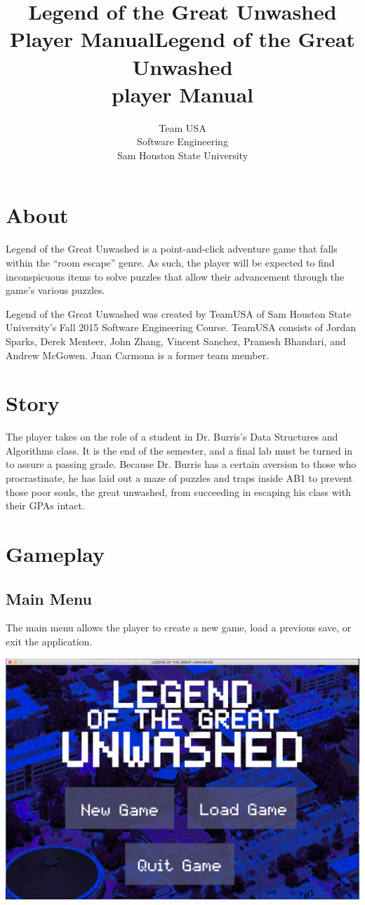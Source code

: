 \documentclass{article}
\title{Legend of the Great Unwashed \\ Player Manual}
\title{Legend of the Great Unwashed \\ player Manual}
\author{Team USA \\ Software Engineering \\ Sam Houston State University}
\begin{document}
%
%
\maketitle
\newpage
%
%
\tableofcontents
\newpage
%
%
\section{About}
	Legend of the Great Unwashed is a point-and-click adventure game that falls within the ``room escape'' genre. As such, the player will be expected to find inconspicuous items to solve puzzles that allow their advancement through the game's various puzzles. 
	
	Legend of the Great Unwashed was created by TeamUSA of Sam Houston State University's Fall 2015 Software Engineering Course. TeamUSA consists of Jordan Sparks, Derek Menteer, John Zhang, Vincent Sanchez, Pramesh Bhandari, and Andrew McGowen. Juan Carmona is a former team member. 
\section{Story}
	The player takes on the role of a student in Dr. Burris's Data Structures and Algorithms class. It is the end of the semester, and a final lab must be turned in to assure a passing grade. Because Dr. Burris has a certain aversion to those who procrastinate, he has laid out a maze of puzzles and traps inside AB1 to prevent those poor souls, the great unwashed, from succeeding in escaping his class with their GPAs intact. 
\section{Gameplay}
	\subsection{Main Menu}
		The main menu allows the player to create a new game, load a previous save, or exit the application.
		\begin{center}
			\includegraphics[scale=0.3]{UMimages/mainMenu}
		\end{center} 
\end{document}
